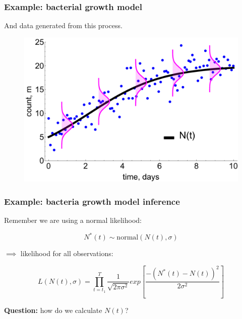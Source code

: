 \documentclass[handout]{beamer}
\begin{document}
\begin{frame}
	\frametitle{Example: bacterial growth model}
	And data generated from this process.
	
	\begin{figure}[ht]
		\centerline{\includegraphics[width=1\textwidth]{animations_figures/lec7_odeSingleBulding3.pdf}}
	\end{figure}
	
\end{frame}

\begin{frame}
	\frametitle{Example: bacteria growth model inference}
	 Remember we are using a normal likelihood:
	
	\begin{equation}
	N^*(t) \sim \text{normal}(N(t), \sigma)
	\end{equation}
	
	$\implies$ likelihood for all observations:
	
	\begin{equation}
	L(N(t),\sigma) = \prod_{t={t_1}}^{T} \frac{1}{\sqrt{2\pi\sigma^2}} exp\left[\frac{-(N^*(t) - N(t))^2}{2\sigma^2}\right]
	\end{equation}
	
	\textbf{Question:} how do we calculate $N(t)$?
	
\end{frame}
\end{document}

